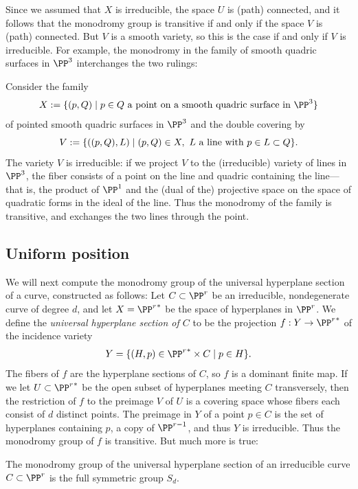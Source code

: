 Since we assumed that $X$ is irreducible, the space $U$ is (path) connected, and it follows that the monodromy group is transitive if and only if the space $V$ is (path) connected. But $V$ is a smooth
variety, so this is the case if and only if $V$ is irreducible. For example, the monodromy in the family
of smooth quadric surfaces in $\PP^3$ interchanges the two rulings:

\begin{example}\label{monodromy of rulings}
Consider the family 
$$
X := \{(p,Q) \mid p\in Q\hbox{ a point on a smooth quadric surface in $\PP^3$}\}
$$
of pointed smooth quadric surfaces in $\PP^3$ and the double covering by  
$$
V:= \{((p,Q), L)\mid (p,Q)\in X,\ L \hbox{ a line with $p \in L\subset Q$}\}.
$$
The variety $V$ is irreducible: if we project $V$ to the (irreducible) variety of lines in $\PP^3$, 
the fiber consists of a point on the line and quadric containing the line---that is, the product
of $\PP^1$ and the (dual of the) projective space
on the space of quadratic forms in the ideal of the line. Thus the monodromy of the family
is transitive, and exchanges the two lines through the point.
\end{example}

\subsection{Uniform position}


We will next compute the monodromy group of the  universal hyperplane section of a curve, constructed as follows:
Let $C \subset \PP^r$ be an irreducible, nondegenerate curve of degree $d$, and let $X = {\PP^r}^*$ be the space of hyperplanes in $\PP^r$. We define the \emph{universal hyperplane section of $C$} to be the projection  $f: Y\to {\PP^r}^*$ of the incidence variety
$$
Y = \{ (H, p) \in {\PP^r}^* \times C \mid p \in H \}.
$$
The fibers of $f$ are the hyperplane
sections of $C$, so $f$ is a dominant finite map. If we let $U\subset {\PP^r}^*$ be the open subset of hyperplanes
meeting $C$ transversely, then the restriction of $f$ to the preimage $V$ of $U$ is a covering space
whose fibers each consist of $d$ distinct points. The preimage in $Y$ of a point $p\in C$ is the set of hyperplanes containing
$p$, a copy of $\PP^{r-1}$, and thus $Y$ is irreducible. Thus the monodromy group of $f$ is transitive. But much more is true:

\begin{theorem}\label{uniform position lemma}
The monodromy group of the universal hyperplane section of an irreducible curve $C \subset \PP^r$ is the full symmetric group $S_d$.
\end{theorem}

